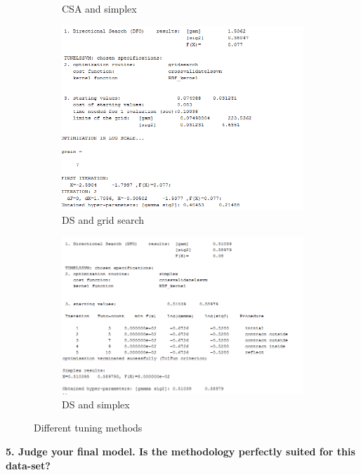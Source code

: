 \documentclass[11pt,oneside,a4paper]{article}
\begin{document}
\begin{figure}[H]
\begin{subfigure}[b]{0.4\textwidth}
		\caption{CSA and simplex}
	\end{subfigure}
	\begin{subfigure}[b]{0.4\textwidth}
		\includegraphics[width=\textwidth]{../Figures/breast_DS_grid}
		\caption{DS and grid search}
	\end{subfigure}
	\begin{subfigure}[b]{0.4\textwidth}
		\includegraphics[width=\textwidth]{../Figures/breast_DS_simp}
		\caption{DS and simplex}
	\end{subfigure}
	\caption{Different tuning methods}
	
\end{figure}

\textbf{5. Judge your final model. Is the methodology perfectly suited for this data-set?}
\end{document}
